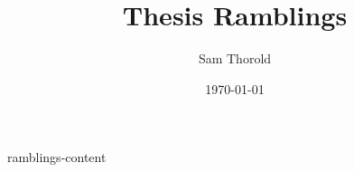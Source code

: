 \documentclass[a4paper, 10pt]{article}
\title{
  Thesis Ramblings
}
\author{Sam Thorold}
\date{\today}
\begin{document}
\maketitle

{ramblings-content}

\end{document}
